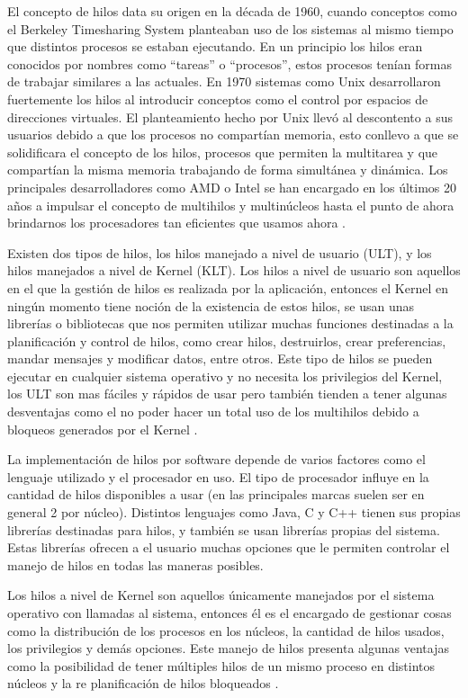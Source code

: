 \documentclass[12pt]{article}
\begin{document}
El concepto de hilos data su origen en la década de 1960, cuando conceptos como el Berkeley Timesharing System planteaban uso de los sistemas al mismo tiempo que distintos procesos se estaban ejecutando. En un principio los hilos eran conocidos por nombres como “tareas” o “procesos”, estos procesos tenían formas de trabajar similares a las actuales. En 1970 sistemas como Unix desarrollaron fuertemente los hilos al introducir conceptos como el control por espacios de direcciones virtuales. El planteamiento hecho por Unix llevó al descontento a sus usuarios debido a que los procesos no compartían memoria, esto conllevo a que se solidificara el concepto de los hilos, procesos que permiten la multitarea y que compartían la misma memoria trabajando de forma simultánea y dinámica. Los principales desarrolladores como AMD o Intel se han encargado en los últimos 20 años a impulsar el concepto de multihilos y multinúcleos hasta el punto de ahora brindarnos los procesadores tan eficientes que usamos ahora \cite{O'Sullivan2005}.

Existen dos tipos de hilos, los hilos manejado a nivel de usuario (ULT), y los hilos manejados a nivel de Kernel (KLT).
Los hilos a nivel de usuario son aquellos en el que la gestión de hilos es realizada por la aplicación, entonces el Kernel en ningún momento tiene noción de la existencia de estos  hilos, se usan unas librerías o bibliotecas que nos permiten utilizar muchas funciones destinadas a la planificación y control de hilos, como crear hilos, destruirlos, crear preferencias, mandar mensajes y modificar datos, entre otros. Este tipo de hilos se pueden ejecutar en cualquier sistema operativo y no necesita los privilegios del Kernel, los ULT son mas fáciles y rápidos de usar pero también tienden a tener algunas desventajas como el no poder hacer un total uso de los multihilos debido a bloqueos generados por el Kernel \cite{Tipos}.

La implementación de hilos por software depende de varios factores como el lenguaje utilizado y el procesador en uso. El tipo de procesador influye en la cantidad de hilos disponibles a usar (en las principales marcas suelen ser en general 2 por núcleo). Distintos lenguajes como Java, C y C++ tienen sus propias librerías  destinadas para hilos, y también se usan librerías propias del sistema. Estas librerías ofrecen a el usuario muchas opciones que le permiten controlar el manejo de hilos en todas las maneras posibles.

Los hilos a nivel de Kernel son aquellos únicamente manejados por el sistema operativo con llamadas al sistema, entonces él es el encargado de gestionar cosas como la distribución de los procesos en los núcleos,  la cantidad de hilos usados, los privilegios y demás opciones. Este manejo de hilos presenta algunas ventajas como la posibilidad de tener múltiples hilos de un mismo proceso en distintos núcleos y la re planificación de hilos bloqueados \cite{Tipos}.
\end{document}
